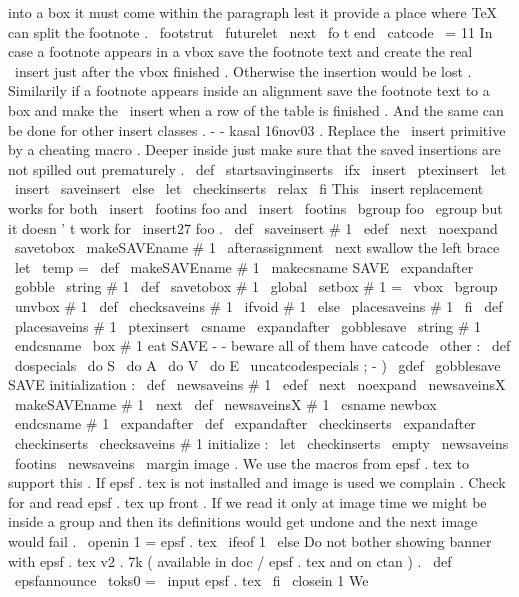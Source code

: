 {{{{into
a
box
it
must
come
within
the
paragraph
lest
it
%
provide
a
place
where
TeX
can
split
the
footnote
.
\
footstrut
\
futurelet
\
next
\
fo
t
}
}
%
end
\
catcode
\
=
11
%
In
case
a
footnote
appears
in
a
vbox
save
the
footnote
text
and
create
%
the
real
\
insert
just
after
the
vbox
finished
.
Otherwise
the
insertion
%
would
be
lost
.
%
Similarily
if
a
footnote
appears
inside
an
alignment
save
the
footnote
%
text
to
a
box
and
make
the
\
insert
when
a
row
of
the
table
is
finished
.
%
And
the
same
can
be
done
for
other
insert
classes
.
-
-
kasal
16nov03
.
%
Replace
the
\
insert
primitive
by
a
cheating
macro
.
%
Deeper
inside
just
make
sure
that
the
saved
insertions
are
not
spilled
%
out
prematurely
.
%
\
def
\
startsavinginserts
{
%
\
ifx
\
insert
\
ptexinsert
\
let
\
insert
\
saveinsert
\
else
\
let
\
checkinserts
\
relax
\
fi
}
%
This
\
insert
replacement
works
for
both
\
insert
\
footins
{
foo
}
and
%
\
insert
\
footins
\
bgroup
foo
\
egroup
but
it
doesn
'
t
work
for
\
insert27
{
foo
}
.
%
\
def
\
saveinsert
#
1
{
%
\
edef
\
next
{
\
noexpand
\
savetobox
\
makeSAVEname
#
1
}
%
\
afterassignment
\
next
%
swallow
the
left
brace
\
let
\
temp
=
}
\
def
\
makeSAVEname
#
1
{
\
makecsname
{
SAVE
\
expandafter
\
gobble
\
string
#
1
}
}
\
def
\
savetobox
#
1
{
\
global
\
setbox
#
1
=
\
vbox
\
bgroup
\
unvbox
#
1
}
\
def
\
checksaveins
#
1
{
\
ifvoid
#
1
\
else
\
placesaveins
#
1
\
fi
}
\
def
\
placesaveins
#
1
{
%
\
ptexinsert
\
csname
\
expandafter
\
gobblesave
\
string
#
1
\
endcsname
{
\
box
#
1
}
%
}
%
eat
SAVE
-
-
beware
all
of
them
have
catcode
\
other
:
{
\
def
\
dospecials
{
\
do
S
\
do
A
\
do
V
\
do
E
}
\
uncatcodespecials
%
;
-
)
\
gdef
\
gobblesave
SAVE
{
}
}
%
initialization
:
\
def
\
newsaveins
#
1
{
%
\
edef
\
next
{
\
noexpand
\
newsaveinsX
\
makeSAVEname
#
1
}
%
\
next
}
\
def
\
newsaveinsX
#
1
{
%
\
csname
newbox
\
endcsname
#
1
%
\
expandafter
\
def
\
expandafter
\
checkinserts
\
expandafter
{
\
checkinserts
\
checksaveins
#
1
}
%
}
%
initialize
:
\
let
\
checkinserts
\
empty
\
newsaveins
\
footins
\
newsaveins
\
margin
%
image
.
We
use
the
macros
from
epsf
.
tex
to
support
this
.
%
If
epsf
.
tex
is
not
installed
and
image
is
used
we
complain
.
%
%
Check
for
and
read
epsf
.
tex
up
front
.
If
we
read
it
only
at
image
%
time
we
might
be
inside
a
group
and
then
its
definitions
would
get
%
undone
and
the
next
image
would
fail
.
\
openin
1
=
epsf
.
tex
\
ifeof
1
\
else
%
Do
not
bother
showing
banner
with
epsf
.
tex
v2
.
7k
(
available
in
%
doc
/
epsf
.
tex
and
on
ctan
)
.
\
def
\
epsfannounce
{
\
toks0
=
}
%
\
input
epsf
.
tex
\
fi
\
closein
1
%
%
We
}}
